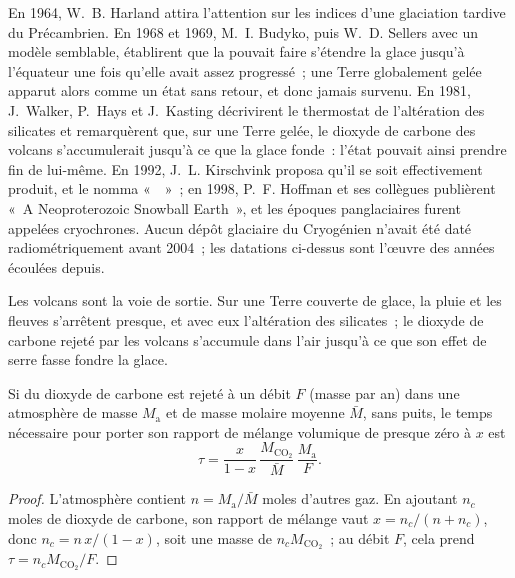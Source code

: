 \begin{history}
En 1964, W.~B. Harland attira l'attention sur les indices d'une glaciation tardive du Précambrien. En
1968 et 1969, M.~I. Budyko, puis W.~D. Sellers avec un modèle semblable, établirent que la 
pouvait faire s'étendre la glace jusqu'à l'équateur une fois qu'elle avait assez progressé~; une Terre
globalement gelée apparut alors comme un état sans retour, et donc jamais survenu.
En 1981, J.~Walker, P.~Hays et J.~Kasting décrivirent le thermostat de l'altération des silicates et
remarquèrent que, sur une Terre gelée, le dioxyde de carbone des volcans s'accumulerait jusqu'à ce que la glace
fonde~: l'état pouvait ainsi prendre fin de lui-même. En 1992, J.~L. Kirschvink proposa qu'il se soit effectivement
produit, et le nomma «~~»~; en 1998, P.~F. Hoffman et ses collègues publièrent
«~A Neoproterozoic Snowball Earth~», et les époques panglaciaires furent appelées cryochrones. Aucun dépôt glaciaire
du Cryogénien n'avait été daté radiométriquement avant 2004~; les datations ci-dessus sont l'œuvre des années
écoulées depuis.
\end{history}

Les volcans sont la voie de sortie. Sur une Terre couverte de glace, la pluie et les fleuves s'arrêtent presque, et avec eux
l'altération des silicates~; le dioxyde de carbone rejeté par les volcans s'accumule dans l'air
jusqu'à ce que son effet de serre fasse fondre la glace.

\begin{proposition}\label{prop:b2:precambrian-earth:co2}
Si du dioxyde de carbone est rejeté à un débit $F$ (masse par an) dans une atmosphère de masse
$M_{\text{a}}$ et de masse molaire moyenne $\bar M$, sans puits, le temps nécessaire pour porter son rapport de
mélange volumique de presque zéro à $x$ est
\[
  \tau = \frac{x}{1 - x}\,\frac{M_{\mathrm{CO_2}}}{\bar M}\,\frac{M_{\text{a}}}{F} .
\]
\end{proposition}

\begin{proof}
L'atmosphère contient $n = M_{\text{a}}/\bar M$ moles d'autres gaz. En ajoutant $n_c$ moles de
dioxyde de carbone, son rapport de mélange vaut $x = n_c/(n + n_c)$, donc $n_c = n\,x/(1 - x)$, soit une masse de
$n_c M_{\mathrm{CO_2}}$~; au débit $F$, cela prend $\tau = n_c M_{\mathrm{CO_2}}/F$.
\end{proof}


